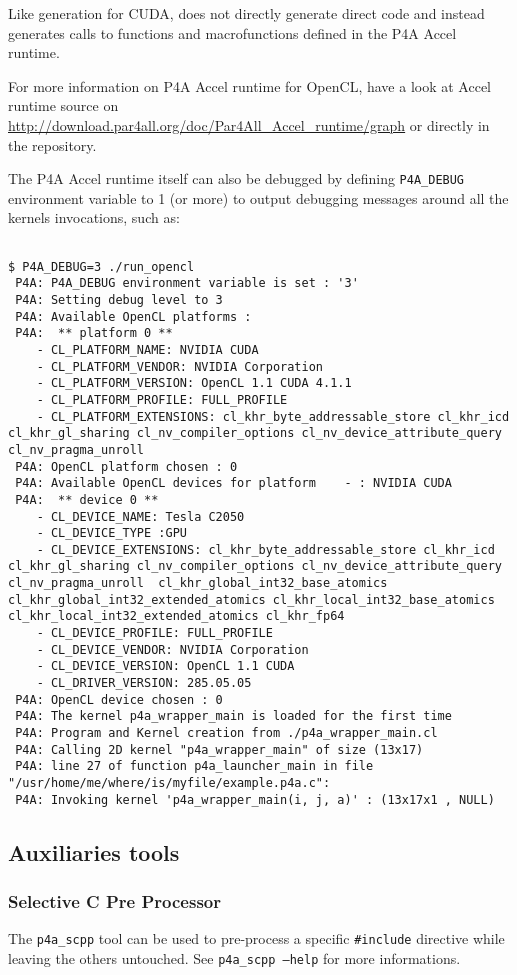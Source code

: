 \documentclass[a4paper]{article}
\begin{document}
Like \Apfa generation for CUDA,  \Apfa does not directly generate
direct \Aopencl code and instead generates calls to functions and
macrofunctions defined in the P4A Accel runtime.

For more information on P4A Accel runtime for OpenCL, have a look at \Apfa Accel runtime source on 
\url{http://download.par4all.org/doc/Par4All_Accel_runtime/graph} or
directly in the \Agit repository.

The P4A Accel runtime itself can also be debugged by defining \verb|P4A_DEBUG| 
environment variable to 1 (or more) to output debugging messages around all
the \Aopencl kernels invocations, such as: {\scriptsize
\begin{verbatim}

$ P4A_DEBUG=3 ./run_opencl
 P4A: P4A_DEBUG environment variable is set : '3'
 P4A: Setting debug level to 3
 P4A: Available OpenCL platforms :
 P4A:  ** platform 0 **
    - CL_PLATFORM_NAME: NVIDIA CUDA
    - CL_PLATFORM_VENDOR: NVIDIA Corporation
    - CL_PLATFORM_VERSION: OpenCL 1.1 CUDA 4.1.1
    - CL_PLATFORM_PROFILE: FULL_PROFILE
    - CL_PLATFORM_EXTENSIONS: cl_khr_byte_addressable_store cl_khr_icd cl_khr_gl_sharing cl_nv_compiler_options cl_nv_device_attribute_query cl_nv_pragma_unroll 
 P4A: OpenCL platform chosen : 0
 P4A: Available OpenCL devices for platform    - : NVIDIA CUDA
 P4A:  ** device 0 **
    - CL_DEVICE_NAME: Tesla C2050
    - CL_DEVICE_TYPE :GPU
    - CL_DEVICE_EXTENSIONS: cl_khr_byte_addressable_store cl_khr_icd cl_khr_gl_sharing cl_nv_compiler_options cl_nv_device_attribute_query cl_nv_pragma_unroll  cl_khr_global_int32_base_atomics cl_khr_global_int32_extended_atomics cl_khr_local_int32_base_atomics cl_khr_local_int32_extended_atomics cl_khr_fp64 
    - CL_DEVICE_PROFILE: FULL_PROFILE
    - CL_DEVICE_VENDOR: NVIDIA Corporation
    - CL_DEVICE_VERSION: OpenCL 1.1 CUDA
    - CL_DRIVER_VERSION: 285.05.05
 P4A: OpenCL device chosen : 0
 P4A: The kernel p4a_wrapper_main is loaded for the first time
 P4A: Program and Kernel creation from ./p4a_wrapper_main.cl
 P4A: Calling 2D kernel "p4a_wrapper_main" of size (13x17)
 P4A: line 27 of function p4a_launcher_main in file "/usr/home/me/where/is/myfile/example.p4a.c":
 P4A: Invoking kernel 'p4a_wrapper_main(i, j, a)' : (13x17x1 , NULL)
\end{verbatim}

}

\subsection{Auxiliaries tools}

\subsubsection{Selective C Pre Processor}

The \texttt{p4a\_scpp} tool can be used to pre-process a specific
\texttt{\#include} directive while leaving the others untouched. See
\texttt{p4a\_scpp --help} for more informations.

\end{document}
